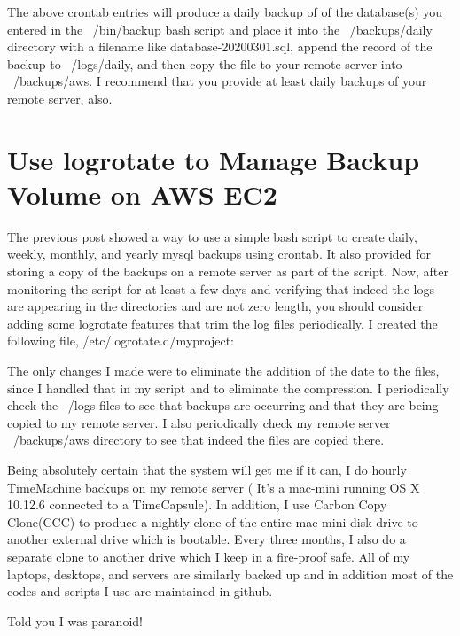 \documentclass[final,letterpaper,12pt]{article}
\begin{document}
\noindent The above crontab entries will produce a daily backup of of the database(s) you entered in the ~/bin/backup bash script and place it into the ~/backups/daily directory with a filename like 
database-20200301.sql, append the record of the backup to ~/logs/daily, and then copy the file to your remote server into ~/backups/aws. I recommend that you provide at least daily backups of your remote server, also.

\section{Use logrotate to Manage Backup Volume on AWS EC2}
\noindent The previous post showed a way to use a simple bash script to create daily, weekly, monthly, and yearly mysql backups using crontab. It also provided for storing a copy of the backups on a remote server as part of the script. Now, after monitoring the script for at least a few days and verifying that indeed the logs are appearing in the directories and are not zero length, you should consider adding some logrotate features that trim the log files periodically. I created the following file, /etc/logrotate.d/myproject:




\noindent The only changes I made were to eliminate the addition of the date to the files, since I handled that in my script and to eliminate the compression. I periodically check the ~/logs files to see that backups are occurring and that they are being copied to my remote server. I also periodically check my remote server ~/backups/aws directory to see that indeed the files are copied there.

Being absolutely certain that the system will get me if it can, I do hourly TimeMachine backups on my remote server ( It's a mac-mini running
OS X 10.12.6 connected to a TimeCapsule). In addition, I use Carbon Copy Clone(CCC) to produce a nightly clone of the entire mac-mini disk drive to another external drive which is bootable. Every three months, I also do a separate clone to another drive which I keep in a fire-proof safe. All of my laptops, desktops, and servers are similarly backed up and in addition most of the codes and scripts I use are maintained in github. 

\noindent Told you I was paranoid!
\end{document}
